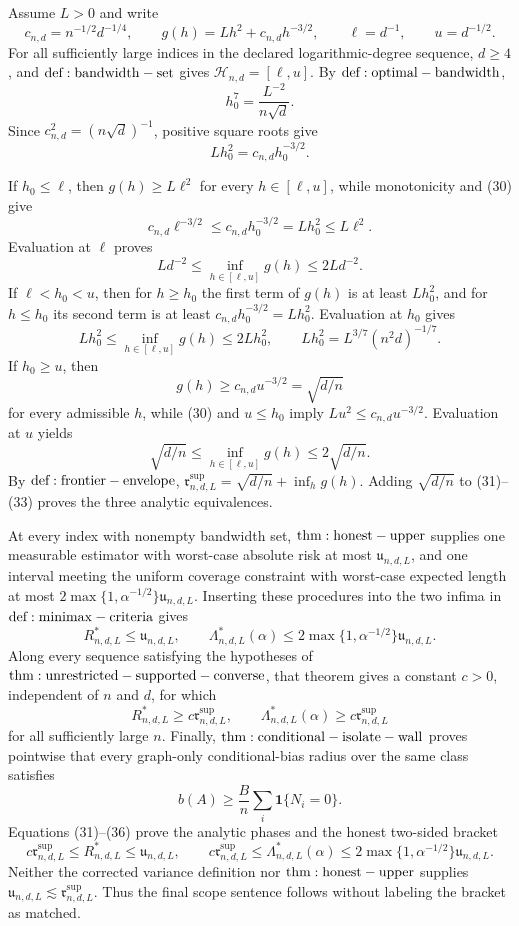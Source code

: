 Assume \(L>0\) and write
\[
 c_{n,d}=n^{-1/2}d^{-1/4},\qquad
 g(h)=Lh^2+c_{n,d}h^{-3/2},\qquad
 \ell=d^{-1},\qquad u=d^{-1/2}.
\tag{29}
\]
For all sufficiently large indices in the declared logarithmic-degree sequence, \(d\ge4\), and \({\rm def:bandwidth-set}\) gives \(\mathcal H_{n,d}=[\ell,u]\).  By \({\rm def:optimal-bandwidth}\),
\[
 h_0^7=\frac{L^{-2}}{n\sqrt d}.
\]
Since \(c_{n,d}^2=(n\sqrt d)^{-1}\), positive square roots give
\[
 Lh_0^2=c_{n,d}h_0^{-3/2}.
\tag{30}
\]

If \(h_0\le\ell\), then \(g(h)\ge L\ell^2\) for every \(h\in[\ell,u]\), while monotonicity and (30) give
\[
 c_{n,d}\ell^{-3/2}\le c_{n,d}h_0^{-3/2}=Lh_0^2\le L\ell^2.
\]
Evaluation at \(\ell\) proves
\[
 Ld^{-2}\le\inf_{h\in[\ell,u]}g(h)\le2Ld^{-2}.
\tag{31}
\]
If \(\ell<h_0<u\), then for \(h\ge h_0\) the first term of \(g(h)\) is at least \(Lh_0^2\), and for \(h\le h_0\) its second term is at least \(c_{n,d}h_0^{-3/2}=Lh_0^2\).  Evaluation at \(h_0\) gives
\[
 Lh_0^2\le\inf_{h\in[\ell,u]}g(h)\le2Lh_0^2,
 \qquad
 Lh_0^2=L^{3/7}(n^2d)^{-1/7}.
\tag{32}
\]
If \(h_0\ge u\), then
\[
 g(h)\ge c_{n,d}u^{-3/2}=\sqrt{d/n}
\]
for every admissible \(h\), while (30) and \(u\le h_0\) imply \(Lu^2\le c_{n,d}u^{-3/2}\).  Evaluation at \(u\) yields
\[
 \sqrt{d/n}\le\inf_{h\in[\ell,u]}g(h)\le2\sqrt{d/n}.
\tag{33}
\]
By \({\rm def:frontier-envelope}\), \(\mathfrak r^{\mathrm{sup}}_{n,d,L}=\sqrt{d/n}+\inf_hg(h)\).  Adding \(\sqrt{d/n}\) to (31)--(33) proves the three analytic equivalences.

At every index with nonempty bandwidth set, \({\rm thm:honest-upper}\) supplies one measurable estimator with worst-case absolute risk at most \(\mathfrak u_{n,d,L}\), and one interval meeting the uniform coverage constraint with worst-case expected length at most \(2\max\{1,\alpha^{-1/2}\}\mathfrak u_{n,d,L}\).  Inserting these procedures into the two infima in \({\rm def:minimax-criteria}\) gives
\[
 R^*_{n,d,L}\le\mathfrak u_{n,d,L},
 \qquad
 \Lambda^*_{n,d,L}(\alpha)
 \le2\max\{1,\alpha^{-1/2}\}\mathfrak u_{n,d,L}.
\tag{34}
\]
Along every sequence satisfying the hypotheses of \({\rm thm:unrestricted-supported-converse}\), that theorem gives a constant \(c>0\), independent of \(n\) and \(d\), for which
\[
 R^*_{n,d,L}\ge c\mathfrak r^{\mathrm{sup}}_{n,d,L},
 \qquad
 \Lambda^*_{n,d,L}(\alpha)\ge c\mathfrak r^{\mathrm{sup}}_{n,d,L}
\tag{35}
\]
for all sufficiently large \(n\).  Finally, \({\rm thm:conditional-isolate-wall}\) proves pointwise that every graph-only conditional-bias radius over the same class satisfies
\[
 b(A)\ge\frac Bn\sum_i\mathbf1\{N_i=0\}.
\tag{36}
\]
Equations (31)--(36) prove the analytic phases and the honest two-sided bracket
\[
 c\mathfrak r^{\mathrm{sup}}_{n,d,L}
 \le R^*_{n,d,L}\le\mathfrak u_{n,d,L},
 \qquad
 c\mathfrak r^{\mathrm{sup}}_{n,d,L}
 \le\Lambda^*_{n,d,L}(\alpha)
 \le2\max\{1,\alpha^{-1/2}\}\mathfrak u_{n,d,L}.
\]
Neither the corrected variance definition nor \({\rm thm:honest-upper}\) supplies \(\mathfrak u_{n,d,L}\lesssim\mathfrak r^{\mathrm{sup}}_{n,d,L}\).  Thus the final scope sentence follows without labeling the bracket as matched.